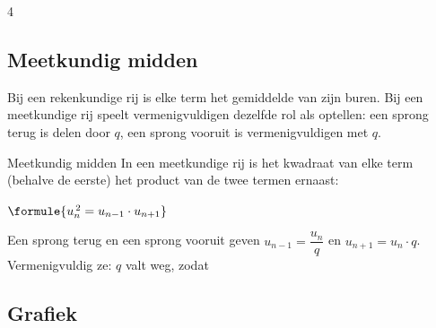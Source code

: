 \begin{alleenvoor}{4}
\subsection{Meetkundig midden}

Bij een rekenkundige rij is elke term het gemiddelde van zijn buren. Bij een meetkundige rij speelt vermenigvuldigen dezelfde rol als optellen: een sprong terug is delen door $q$, een sprong vooruit is vermenigvuldigen met $q$.

\begin{theorie}
\begin{stelling}{Meetkundig midden}
In een meetkundige rij is het kwadraat van elke term (behalve de eerste) het product van de twee termen ernaast:

\vspace{1mm}
\qquad $\formule{u_n^{\,2} = u_{n-1} \cdot u_{n+1}}$
\end{stelling}

\begin{bewijs}
Een sprong terug en een sprong vooruit geven $u_{n-1} = \dfrac{u_n}{q}$ en $u_{n+1} = u_n \cdot q$. Vermenigvuldig ze: $q$ valt weg, zodat
\end{bewijs}
\end{theorie}


\begin{oefeningen}
\end{oefeningen}

\end{alleenvoor}
\subsection{Grafiek}

